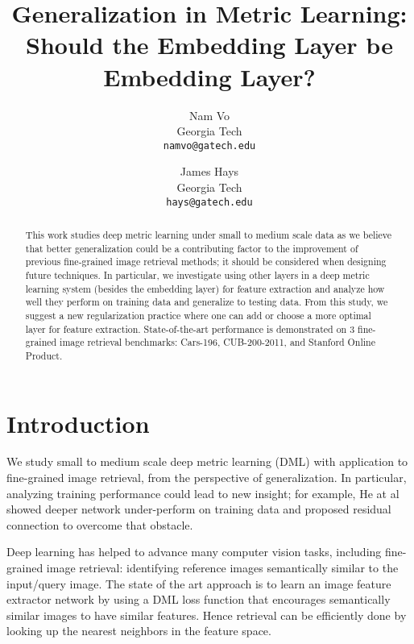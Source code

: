 \documentclass[10pt,twocolumn,letterpaper]{article}
\begin{document}
\title{Generalization in Metric Learning: \\ Should the Embedding Layer be Embedding Layer?}

\author{Nam Vo \\
Georgia Tech \\
{\tt\small namvo@gatech.edu}
\and
James Hays \\
Georgia Tech \\
{\tt\small hays@gatech.edu}
}

\maketitle
\ifwacvfinal\thispagestyle{empty}\fi

\begin{abstract}


This work studies deep metric learning under small to medium scale data as we believe that better generalization could be a contributing factor to the improvement of previous fine-grained image retrieval methods; it should be considered when designing future techniques. In particular, we investigate using other layers in a deep metric learning system (besides the embedding layer) for feature extraction and analyze how well they perform on training data and generalize to testing data. 
From this study, we suggest a new regularization practice where one can add or choose a more optimal layer for feature extraction. State-of-the-art performance is demonstrated on 3 fine-grained image retrieval benchmarks: Cars-196, CUB-200-2011, and Stanford Online Product.

\end{abstract}


\section{Introduction}


We study small to medium scale deep metric learning (DML) with application to fine-grained image retrieval, from the perspective of generalization. In particular, analyzing training performance could lead to new insight; for example, He at al \cite{he2016deep} showed deeper network under-perform on training data and proposed residual connection to overcome that obstacle.


Deep learning has helped to advance many computer vision tasks, including fine-grained image retrieval: identifying reference images semantically similar to the input/query image. The state of the art approach is to learn an image feature extractor network by using a DML loss function that encourages semantically similar images to have similar features. Hence retrieval can be efficiently done by looking up the nearest neighbors in the feature space.
\end{document}
